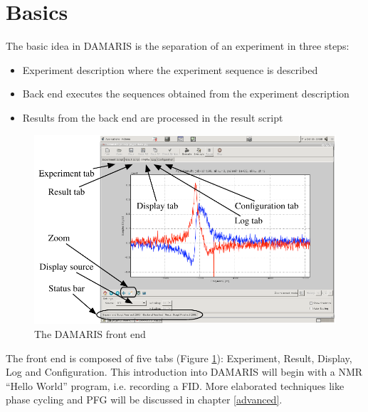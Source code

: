 \documentclass[12pt, a4paper, BCOR10mm, twoside, titlepage, headinclude]{scrbook}
\begin{document}
\section{Basics}
The basic idea in DAMARIS is the separation of an experiment in three steps:
\begin{itemize}
\item Experiment description where the experiment sequence is described
\item Back end executes the sequences obtained from the experiment description
\item Results from the back end are processed in the result script
\end{itemize}
\begin{figure}
\centering
\includegraphics[]{damaris_description}
\caption{The \textsf{DAMARIS} front end}
\label{damarisoverview}
\end{figure}
The front end is composed of five tabs (Figure \ref{damarisoverview}): Experiment, Result, Display, Log and Configuration. This introduction into \textsf{DAMARIS} will begin with a NMR ``Hello World'' program, i.e. recording a FID. More elaborated techniques like phase cycling and PFG will be discussed in chapter \ref{advanced}.
\end{document}
